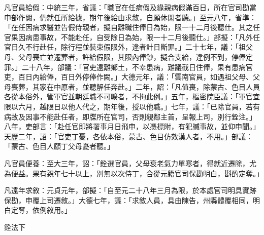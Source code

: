 \begin{pinyinscope}
 凡官員給假：中統三年，省議：「職官在任病假及緣親病假滿百日，所在官司勘當申部作闕，仍就任所給據，期年後給由求敘，自願休閑者聽。」至元八年，省準：「在任因病求醫並告假侍親者，擬自離職住俸日為始，限一十二月後聽仕。其之任官果因病患事故，不能赴任，自受除日為始，限一十二月後聽仕。」部擬：「凡外任官日久不行赴任，除行程並裝束假限外，違者計日斷罪。」二十七年，議：「祖父母、父母喪亡並遷葬者，許給假限，其限內俸鈔，擬合支給，違例不到，停俸定罪。」二十八年，部議：「官吏遠離鄉土，不幸患病，難議截日住俸，果有患病官吏，百日內給俸，百日外停俸作闕。」大德元年，議：「雲南官員，如遇祖父母、父母喪葬，其家在中原者，並聽解任奔赴。」二年，詔：「凡值喪，除蒙古、色目人員各從本俗外，管軍官並朝廷職不可曠者，不拘此例。」五年，樞密院臣議：「軍官宜限以六月，越限日以他人代之，期年後，授以他職。」七年，議：「已除官員，若有病故及因事不能赴任者，即牒所在官司，否則親鄰主首，呈報上司，別行銓注。」八年，吏部言：「赴任官即將署事月日飛申，以憑標附，有犯贓事故，並仰申聞。」天歷二年，詔：「官吏丁憂，各依本俗，蒙古、色目仿效漢人者，不用。」部議：「蒙古、色目人願丁父母憂者聽。」



 凡官員便養：至大三年，詔：「銓選官員，父母衰老氣力單寒者，得就近遷除，尤為便益。果有親年七十以上，別無以次侍丁，合從元籍官司保勘明白，斟酌定奪。」



 凡遠年求敘：元貞元年，部擬：「自至元二十八年三月為限，於本處官司明具實跡保勘，申覆上司遷敘。」大德七年，議：「求敘人員，具由陳告，州縣體覆相同，明白定奪，依例敘用。」



 銓法下




\end{pinyinscope}
